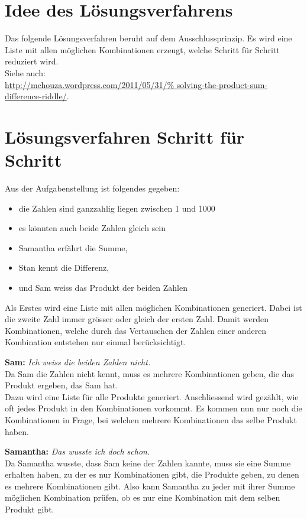 \documentclass[a4paper, 10pt, fleqn]{article}
\begin{document}
\newpage

\section{Idee des Lösungsverfahrens}
Das folgende Lösungsverfahren beruht auf dem Ausschlussprinzip. Es wird eine 
Liste mit allen möglichen Kombinationen erzeugt, welche Schritt für Schritt 
reduziert wird. \\
Siehe auch: \\
\url{http://mchouza.wordpress.com/2011/05/31/%
solving-the-product-sum-difference-riddle/}. 

\section{Lösungsverfahren Schritt für Schritt}
Aus der Aufgabenstellung ist folgendes gegeben: 
\begin{itemize}
\item die Zahlen sind ganzzahlig liegen zwischen 1 und 1000
\item es könnten auch beide Zahlen gleich sein
\item Samantha erfährt die Summe,
\item Stan kennt die Differenz,
\item und Sam weiss das Produkt der beiden Zahlen
\end{itemize}

Als Erstes wird eine Liste mit allen möglichen Kombinationen generiert. Dabei 
ist die zweite Zahl immer grösser oder gleich der ersten Zahl. Damit werden 
Kombinationen, welche durch das Vertauschen der Zahlen einer anderen 
Kombination entstehen nur einmal berücksichtigt. 


\textbf{Sam: }\emph{Ich weiss die beiden Zahlen nicht. } \\
Da Sam die Zahlen nicht kennt, muss es mehrere Kombinationen geben, die das 
Produkt ergeben, das Sam hat. \\
Dazu wird eine Liste für alle Produkte generiert. Anschliessend wird gezählt, 
wie oft jedes Produkt in den Kombinationen vorkommt. Es kommen nun nur noch die 
Kombinationen in Frage, bei welchen mehrere Kombinationen das selbe Produkt 
haben. 


\textbf{Samantha: }\emph{Das wusste ich doch schon. } \\
Da Samantha wusste, dass Sam keine der Zahlen kannte, muss sie eine Summe 
erhalten haben, zu der es nur Kombinationen gibt, die Produkte geben, zu denen 
es mehrere Kombinationen gibt. Also kann Samantha zu jeder mit ihrer Summe 
möglichen Kombination prüfen, ob es nur eine Kombination mit dem selben Produkt 
gibt. 

\end{document}
